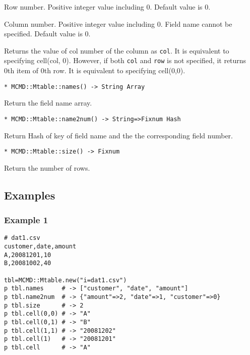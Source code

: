 \begin{description}
\setlength{\itemindent}{0mm}
\item[row ] Row number. Positive integer value including 0. Default value is 0. 
\item[col ] Column number. Positive integer value including 0. Field name cannot be specified. Default value is 0.
\end{description}

Returns the value of  col number of the column as \verb|col|. It is equivalent to specifying cell(col, 0). However, if both \verb|col| and \verb|row| is not specified, it returns 0th item of 0th row. It is equivalent to specifying cell(0,0).


{\Large
\begin{verbatim}
* MCMD::Mtable::names() -> String Array
\end{verbatim}
}

Return the field name array.

{\Large
\begin{verbatim}
* MCMD::Mtable::name2num() -> String=>Fixnum Hash
\end{verbatim}
}

Return Hash of key of field name and the the corresponding field number.


{\Large
\begin{verbatim}
* MCMD::Mtable::size() -> Fixnum
\end{verbatim}
}

Return the number of rows.


\subsection{Examples}
\subsubsection*{Example 1}

\begin{Verbatim}[baselinestretch=0.7,frame=single]
# dat1.csv
customer,date,amount
A,20081201,10
B,20081002,40

tbl=MCMD::Mtable.new("i=dat1.csv")
p tbl.names     # -> ["customer", "date", "amount"]
p tbl.name2num  # -> {"amount"=>2, "date"=>1, "customer"=>0}
p tbl.size      # -> 2
p tbl.cell(0,0) # -> "A"
p tbl.cell(0,1) # -> "B"
p tbl.cell(1,1) # -> "20081202"
p tbl.cell(1)   # -> "20081201"
p tbl.cell      # -> "A"
\end{Verbatim}

